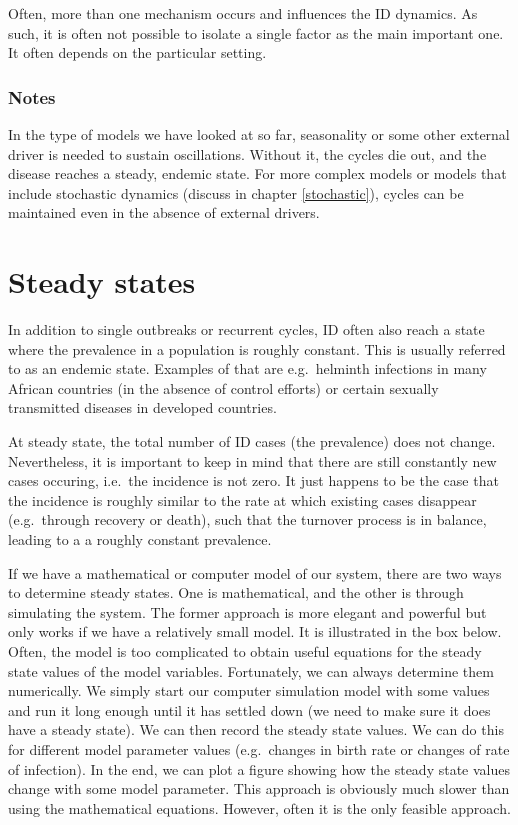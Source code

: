 \documentclass[
]{book}
\begin{document}
Often, more than one mechanism occurs and influences the ID dynamics. As such, it is often not possible to isolate a single factor as the main important one. It often depends on the particular setting.

\hypertarget{mynotebox}{%
\subsubsection{Notes}\label{mynotebox}}

In the type of models we have looked at so far, seasonality or some other external driver is needed to sustain oscillations. Without it, the cycles die out, and the disease reaches a steady, endemic state. For more complex models or models that include stochastic dynamics (discuss in chapter \ref{stochastic}), cycles can be maintained even in the absence of external drivers.

\hypertarget{steady-states}{%
\section{Steady states}\label{steady-states}}

In addition to single outbreaks or recurrent cycles, ID often also reach a state where the prevalence in a population is roughly constant. This is usually referred to as an endemic state. Examples of that are e.g.~helminth infections in many African countries (in the absence of control efforts) or certain sexually transmitted diseases in developed countries.

At steady state, the total number of ID cases (the prevalence) does not change. Nevertheless, it is important to keep in mind that there are still constantly new cases occuring, i.e.~the incidence is not zero. It just happens to be the case that the incidence is roughly similar to the rate at which existing cases disappear (e.g.~through recovery or death), such that the turnover process is in balance, leading to a a roughly constant prevalence.

If we have a mathematical or computer model of our system, there are two ways to determine steady states. One is mathematical, and the other is through simulating the system. The former approach is more elegant and powerful but only works if we have a relatively small model. It is illustrated in the box below. Often, the model is too complicated to obtain useful equations for the steady state values of the model variables. Fortunately, we can always determine them numerically. We simply start our computer simulation model with some values and run it long enough until it has settled down (we need to make sure it does have a steady state). We can then record the steady state values. We can do this for different model parameter values (e.g.~changes in birth rate or changes of rate of infection). In the end, we can plot a figure showing how the steady state values change with some model parameter. This approach is obviously much slower than using the mathematical equations. However, often it is the only feasible approach.
\end{document}

